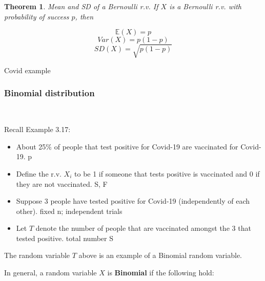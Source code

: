 \documentclass[12pt]{amsart}
\newtheorem{theorem}{Theorem}[section]
\begin{document}
{%

\begin{theorem}{Mean and SD of a Bernoulli r.v.} \newline
If $X$ is a Bernoulli r.v. with probability of success $p$, then 

\color{blue}
$$\mathbb{E}(X) = p$$
$$Var(X) = p(1-p)$$
$$SD(X) =  \sqrt{p(1-p)}$$
\color{black}


\end{theorem}


\color{blue}
Covid example
\color{black}


\newpage
\subsubsection{Binomial distribution}  $ \ $



\vspace{0.5cm}
Recall Example 3.17:
\begin{itemize}
\item About 25\% of people that test positive for Covid-19 are vaccinated for Covid-19.
\color{blue}p\color{black}
\item Define the r.v. $X_i$ to be 1 if someone that tests positive is vaccinated and 0 if they are not vaccinated. 
\color{blue}S, F\color{black}
\item Suppose 3 people have tested positive for Covid-19 (independently of each other). 
\color{blue}fixed n; independent trials\color{black}
\item Let $T$ denote the number of people that are vaccinated amongst the 3 that tested positive.
\color{blue}total number S\color{black}
\end{itemize}

\vspace{0.5cm}
The random variable $T$ above is an example of a Binomial random variable. \newline

\vspace{0.5cm}

In general, a random variable $X$ is \textbf{Binomial} if the following hold:

}
\end{document}
